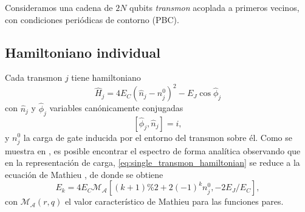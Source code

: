 Consideramos una cadena de $2N$ qubits \textit{transmon} acoplada a primeros vecinos, con condiciones periódicas de contorno (PBC).
\subsection{Hamiltoniano individual}
Cada transmon $j$ tiene hamiltoniano
\begin{equation}
    \hat H_j = 4E_C (\hat  n_j - n_j^0)^2 - E_J \cos \hat \phi_j \label{eq:single_transmon_hamiltonian}    
\end{equation}
con $\hat n_j$ y $\hat \phi_j$ variables canónicamente conjugadas
\begin{equation}
    \left[\hat \phi_j, \hat n_j\right] = i,
\end{equation}
y $n_j^0$ la carga de gate inducida por el entorno del transmon sobre él. Como se muestra en \cite{Koch2007}, es posible encontrar el espectro de forma analítica observando que en la representación de carga, \eqref{eq:single_transmon_hamiltonian} se reduce a la ecuación de Mathieu \cite{Meixner1980}, de donde se obtiene
\begin{equation}
    E_k = 4E_C \mathcal{M}_\mathcal{A}\left[(k+1)\%2 + 2(-1)^k n_j^0, -2E_J / E_C\right], \label{eq:mathieu_spectrum}
\end{equation}
con $\mathcal{M}_\mathcal{A}(r, q)$ el valor característico de Mathieu para las funciones pares.\\

